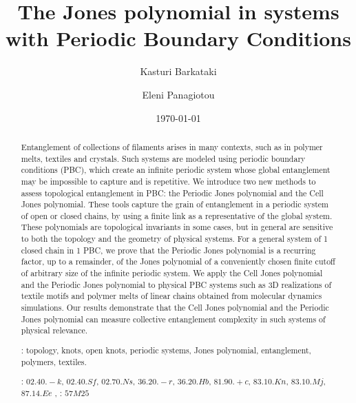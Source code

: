 \documentclass{article}
\begin{document}
\title{The Jones polynomial in systems with Periodic Boundary Conditions}

\author{Kasturi Barkataki \and Eleni Panagiotou}

\date{\today}

\maketitle

\begin{abstract}
Entanglement of collections of  filaments arises in many contexts, such as in polymer melts, textiles and crystals. Such systems are modeled using periodic boundary conditions (PBC), which create an infinite periodic system whose global entanglement may be impossible to capture and is repetitive.  We introduce two new methods to assess topological entanglement in PBC: the Periodic Jones polynomial and the Cell Jones polynomial. These tools capture the grain of entanglement in a periodic system of open or closed chains, by using a finite link as a representative of the global system. These polynomials are topological invariants in some cases, but in general are sensitive to both the topology and the geometry of physical systems. For a general system of 1 closed chain in 1 PBC, we prove that the Periodic Jones polynomial is a recurring factor, up to a remainder, of the Jones polynomial of a conveniently chosen finite cutoff of arbitrary size of the infinite periodic system. We apply the Cell Jones polynomial and the Periodic Jones polynomial to physical PBC systems such as 3D realizations of textile motifs and polymer melts of linear chains obtained from molecular dynamics simulations.  Our results demonstrate that the Cell Jones polynomial and the Periodic Jones polynomial can measure collective entanglement complexity in such systems of physical relevance. 
\vspace{2pc}

: {\small topology, knots, open knots, periodic systems, Jones polynomial, entanglement, polymers, textiles. } 

: {\small $02.40.-k$, $02.40.Sf$, $02.70.Ns$, $36.20.-r$, $36.20.Hb$, $81.90.+c$, $83.10.Kn$, $83.10.Mj$, $87.14.Ee$ },
: {\small $57M25$ }
\end{abstract}
%
% 
%
\end{document}
